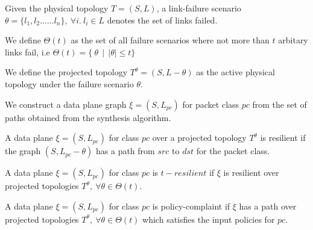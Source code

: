 \begin{mydef}
Given the physical topology $T=(S,L)$, a link-failure
scenario $\theta = \{l_1, l_2 \ldots ... l_n\},\ \forall i.\ l_i \in L$ 
denotes the set of links failed. 
\end{mydef}
\begin{mydef}
	We define $\Theta(t)$ as the set of all failure scenarios where not more than $t$
	arbitary links fail, i.e $\Theta(t) = \{ \ \theta \ \ | \ \ |\theta| \leq t\}$
\end{mydef}
\begin{mydef}
	We define
	the projected topology $T^{\theta} = (S, L - \theta)$ as the active
	physical topology under the failure scenario $\theta$.  
\end{mydef}
\noindent We construct a data plane graph $\xi = (S, L_{pc})$ for packet class $pc$ from the set
of paths obtained from the synthesis algorithm. 
\begin{mydef}
	A data plane $\xi = (S, L_{pc})$ for class $pc$ over a projected topology $T^\theta$ 
	is resilient if the graph $(S, L_{pc} - \theta)$ has a path from $src$ to $dst$ 
	for the packet class. 
\end{mydef}
\begin{mydef}
	A data plane $\xi = (S, L_{pc})$ for class $pc$ is $t-resilient$ if $\xi$ is 
	resilient over projected topologies $T^\theta,\ \forall \theta \in \Theta(t)$.
\end{mydef}
\begin{mydef}
	A data plane $\xi = (S, L_{pc})$ for class $pc$ is policy-complaint if $\xi$ has 
	a path over projected topologies $T^\theta,\ \forall \theta \in \Theta(t)$ which
	satisfies the input policies for $pc$. 
\end{mydef}
